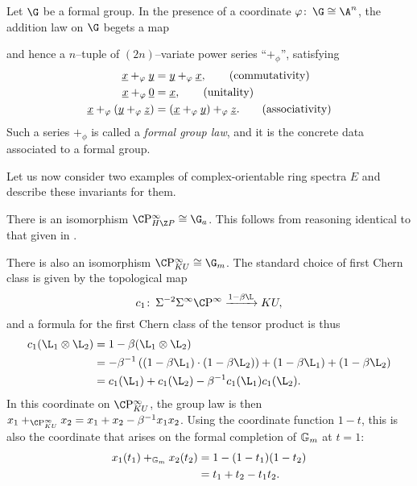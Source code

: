\begin{definition}\label{FGLDefinition}
Let \(\G\) be a formal group.  In the presence of a coordinate \(\phi \co \G \cong \A^n\), the addition law on \(\G\) begets a map
\begin{center}
\end{center}
and hence a \(n\)--tuple of \((2n)\)--variate power series ``\(+_\phi\)'', satisfying
\begin{align*}
\underline{\smash x} +_\phi \underline{\smash y} & = \underline{\smash y} +_\phi \underline{\smash x}, \tag{commutativity} \\
\underline{\smash x} +_\phi \underline{\smash 0} & = \underline{\smash x}, \tag{unitality} \\
\underline{\smash x} +_\phi (\underline{\smash y} +_\phi \underline{\smash z}) & = (\underline{\smash x} +_\phi \underline{\smash y}) +_\phi \underline{\smash z}. \tag{associativity}
\end{align*}
Such a series \(+_\phi\) is called a \textit{formal group law}, and it is the concrete data associated to a formal group.
\end{definition}

Let us now consider two examples of complex-orientable ring spectra \(E\) and describe these invariants for them.

\begin{example}\label{HZGivesGa}
There is an isomorphism \(\CP^\infty_{H\Z P} \cong \G_a\).  This follows from reasoning identical to that given in .
\end{example}

\begin{example}\label{CPinftyKUExample}
There is also an isomorphism \(\CP^\infty_{KU} \cong \G_m\).  The standard choice of first Chern class is given by the topological map \[c_1\co \Susp^{-2} \Susp^\infty \CP^\infty \xrightarrow{1 - \beta \L} KU,\] and a formula for the first Chern class of the tensor product is thus
\begin{align*}
c_1(\L_1 \otimes \L_2) & = 1 - \beta(\L_1 \otimes \L_2) \\
& = -\beta^{-1} \left( (1 - \beta \L_1) \cdot (1 - \beta \L_2) \right) + (1 - \beta \L_1) + (1 - \beta \L_2) \\
& = c_1(\L_1) + c_1(\L_2) - \beta^{-1} c_1(\L_1) c_1(\L_2).
\end{align*}
In this coordinate on \(\CP^\infty_{KU}\), the group law is then \(x_1 +_{\CP^\infty_{KU}} x_2 = x_1 + x_2 - \beta^{-1} x_1 x_2\).  Using the coordinate function \(1 - t\), this is also the coordinate that arises on the formal completion of \(\Gm\) at \(t = 1\):
\begin{align*}
x_1(t_1) +_{\Gm} x_2(t_2) & = 1 - (1 - t_1)(1 - t_2) \\
& = t_1 + t_2 - t_1 t_2.
\end{align*}
\end{example}


